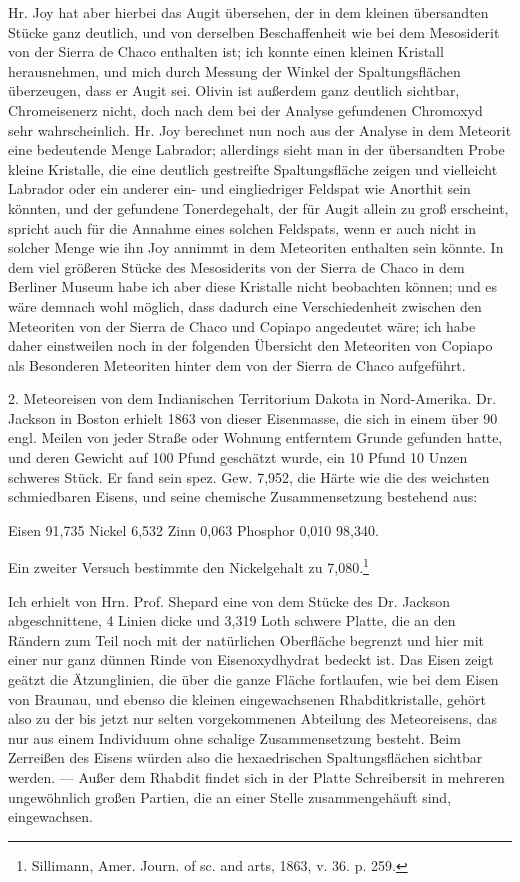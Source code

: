\documentclass[a4paper, 11pt, oneside]{article}
\begin{document}
Hr. Joy hat aber hierbei das Augit übersehen, der in dem kleinen übersandten Stücke ganz deutlich, und von derselben Beschaffenheit wie bei dem Mesosiderit von der Sierra de Chaco enthalten ist; ich konnte einen kleinen Kristall herausnehmen, und mich durch Messung der Winkel der Spaltungsflächen überzeugen, dass er Augit sei. Olivin ist außerdem ganz deutlich sichtbar, Chromeisenerz nicht, doch nach dem bei der Analyse gefundenen Chromoxyd sehr wahrscheinlich. Hr. Joy berechnet nun noch aus der Analyse in dem Meteorit eine bedeutende Menge Labrador; allerdings sieht man in der übersandten Probe kleine Kristalle, die eine deutlich gestreifte Spaltungsfläche zeigen und vielleicht Labrador oder ein anderer ein- und eingliedriger Feldspat wie Anorthit sein könnten, und der gefundene Tonerdegehalt, der für Augit allein zu groß erscheint, spricht auch für die Annahme eines solchen Feldspats, wenn er auch nicht in solcher Menge wie ihn Joy annimmt in dem Meteoriten enthalten sein könnte. In dem viel größeren Stücke des Mesosiderits von der Sierra de Chaco in dem Berliner Museum habe ich aber diese Kristalle nicht beobachten können; und es wäre demnach wohl möglich, dass dadurch eine Verschiedenheit zwischen den Meteoriten von der Sierra de Chaco und Copiapo angedeutet wäre; ich habe daher einstweilen noch in der folgenden Übersicht den Meteoriten von Copiapo als Besonderen Meteoriten hinter dem von der Sierra de Chaco aufgeführt.

2. Meteoreisen von dem Indianischen Territorium Dakota in Nord-Amerika. Dr. Jackson in Boston erhielt 1863 von dieser Eisenmasse, die sich in einem über 90 engl. Meilen von jeder Straße oder Wohnung entferntem Grunde gefunden hatte, und deren Gewicht auf 100 Pfund geschätzt wurde, ein 10 Pfund 10 Unzen schweres Stück. Er fand sein spez. Gew. 7,952, die Härte wie die des weichsten schmiedbaren Eisens, und seine chemische Zusammensetzung bestehend aus:

Eisen 91,735  
Nickel 6,532  
Zinn 0,063  
Phosphor 0,010  
98,340.  

Ein zweiter Versuch bestimmte den Nickelgehalt zu 7,080.\footnote{Sillimann, Amer. Journ. of sc. and arts, 1863, v. 36. p. 259.}

Ich erhielt von Hrn. Prof. Shepard eine von dem Stücke des Dr. Jackson abgeschnittene, 4 Linien dicke und 3,319 Loth schwere Platte, die an den Rändern zum Teil noch mit der natürlichen Oberfläche begrenzt und hier mit einer nur ganz dünnen Rinde von Eisenoxydhydrat bedeckt ist. Das Eisen zeigt geätzt die Ätzunglinien, die über die ganze Fläche fortlaufen, wie bei dem Eisen von Braunau, und ebenso die kleinen eingewachsenen Rhabditkristalle, gehört also zu der bis jetzt nur selten vorgekommenen Abteilung des Meteoreisens, das nur aus einem Individuum ohne schalige Zusammensetzung besteht. Beim Zerreißen des Eisens würden also die hexaedrischen Spaltungsflächen sichtbar werden. — Außer dem Rhabdit findet sich in der Platte Schreibersit in mehreren ungewöhnlich großen Partien, die an einer Stelle zusammengehäuft sind, eingewachsen.
\end{document}
